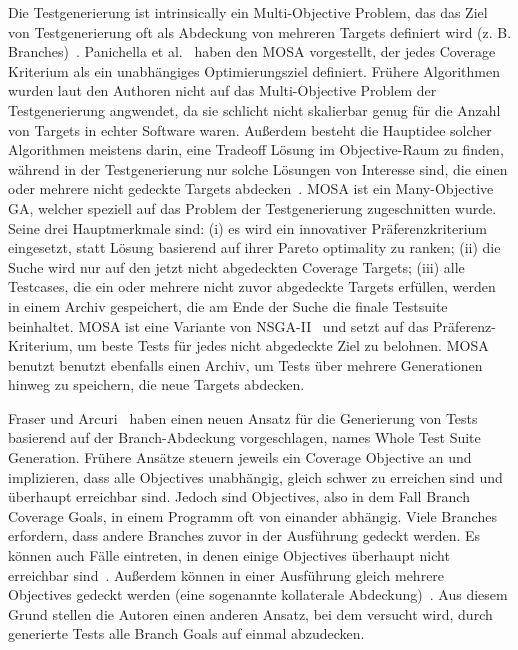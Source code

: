 \documentclass{article}
\begin{document}
Die Testgenerierung ist intrinsically ein Multi-Objective Problem, das das Ziel von Testgenerierung oft als Abdeckung von mehreren Targets definiert wird (z. B. Branches)~\cite{Panichella2018}. Panichella et al.~\cite{Panichella_2015} haben den \ac{MOSA} vorgestellt, der jedes Coverage Kriterium als ein unabhängiges Optimierungsziel definiert. Frühere Algorithmen wurden laut den Authoren nicht auf das Multi-Objective Problem der Testgenerierung angwendet, da sie schlicht nicht skalierbar genug für die Anzahl von Targets in echter Software waren. Außerdem besteht die Hauptidee solcher Algorithmen meistens darin, eine Tradeoff Lösung im Objective-Raum zu finden, während in der Testgenerierung nur solche Lösungen von Interesse sind, die einen oder mehrere nicht gedeckte Targets abdecken~\cite{Panichella2018}. \ac{MOSA} ist ein Many-Objective \ac{GA}, welcher speziell auf das Problem der Testgenerierung zugeschnitten wurde. Seine drei Hauptmerkmale sind: (i) es wird ein innovativer Präferenzkriterium eingesetzt, statt Lösung basierend auf ihrer Pareto optimality zu ranken; (ii) die Suche wird nur auf den jetzt nicht abgedeckten Coverage Targets; (iii) alle Testcases, die ein oder mehrere nicht zuvor abgedeckte Targets erfüllen, werden in einem Archiv gespeichert, die am Ende der Suche die finale Testsuite beinhaltet. \ac{MOSA} ist eine Variante von NSGA-II~\cite{Deb_2000} und setzt auf das Präferenz-Kriterium, um beste Tests für jedes nicht abgedeckte Ziel zu belohnen. \ac{MOSA} benutzt benutzt ebenfalls einen Archiv, um Tests über mehrere Generationen hinweg zu speichern, die neue Targets abdecken. 

Fraser und Arcuri~\cite{Fraser_2013} haben einen neuen Ansatz für die Generierung von Tests basierend auf der Branch-Abdeckung vorgeschlagen, names Whole Test Suite Generation. Frühere Ansätze steuern jeweils ein Coverage Objective an und implizieren, dass alle Objectives unabhängig, gleich schwer zu erreichen sind und überhaupt erreichbar sind. Jedoch sind Objectives, also in dem Fall Branch Coverage Goals, in einem Programm oft von einander abhängig\cite{Fraser_2013}. Viele Branches erfordern, dass andere Branches zuvor in der Ausführung gedeckt werden. Es können auch Fälle eintreten, in denen einige Objectives überhaupt nicht erreichbar sind~\cite{Goldberg_1994}. Außerdem können in einer Ausführung gleich mehrere Objectives gedeckt werden (eine sogenannte kollaterale Abdeckung)~\cite{Fraser_2011}. Aus diesem Grund stellen die Autoren einen anderen Ansatz, bei dem versucht wird, durch generierte Tests alle Branch Goals auf einmal abzudecken. 
\end{document}
